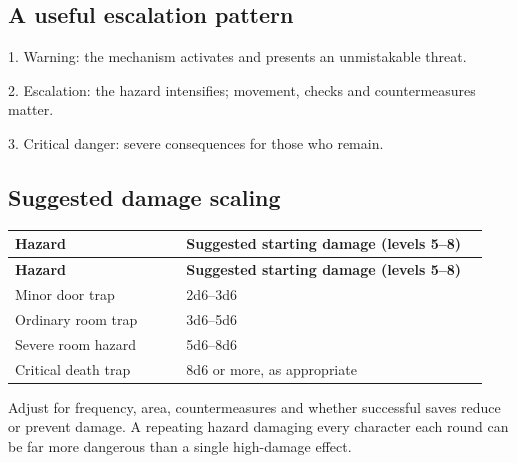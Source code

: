 \subsection{A useful escalation pattern}

1. Warning: the mechanism activates and presents an unmistakable threat.

2. Escalation: the hazard intensifies; movement, checks and countermeasures matter.

3. Critical danger: severe consequences for those who remain.

\subsection{Suggested damage scaling}

\begin{longtable}{p{0.34\linewidth}p{0.6\linewidth}}

\rowcolor{tablehead} \textbf{Hazard} & \textbf{Suggested starting damage (levels 5–8)} \\

\endfirsthead

\rowcolor{tablehead} \textbf{Hazard} & \textbf{Suggested starting damage (levels 5–8)} \\

\endhead

Minor door trap & 2d6–3d6 \\

Ordinary room trap & 3d6–5d6 \\

Severe room hazard & 5d6–8d6 \\

Critical death trap & 8d6 or more, as appropriate \\

\end{longtable}

Adjust for frequency, area, countermeasures and whether successful saves reduce or prevent damage. A repeating hazard damaging every character each round can be far more dangerous than a single high-damage effect.
